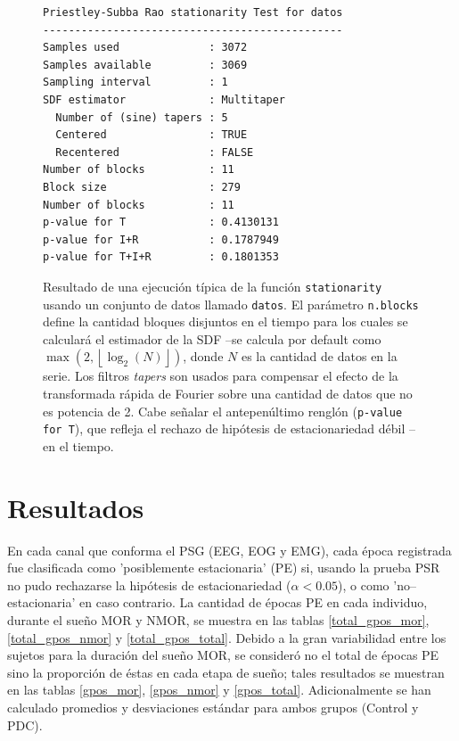 \documentclass[12pt,a4paper]{mitthesis}
\begin{document}
\begin{figure}
\centering
\begin{lstlisting}
Priestley-Subba Rao stationarity Test for datos
-----------------------------------------------
Samples used              : 3072 
Samples available         : 3069 
Sampling interval         : 1 
SDF estimator             : Multitaper 
  Number of (sine) tapers : 5 
  Centered                : TRUE 
  Recentered              : FALSE 
Number of blocks          : 11 
Block size                : 279 
Number of blocks          : 11 
p-value for T             : 0.4130131 
p-value for I+R           : 0.1787949 
p-value for T+I+R         : 0.1801353 
\end{lstlisting}
\caption{Resultado de una ejecuci\'on t\'ipica de la funci\'on \texttt{stationarity} usando un 
conjunto de datos llamado \texttt{datos}. 
El par\'ametro \texttt{n.blocks} define la cantidad bloques disjuntos en el tiempo para los cuales 
se calcular\'a el estimador de la SDF --se calcula por default como
$\max \left( 2 , \left\lfloor \log_2\left( N \right) \right\rfloor \right)$, donde $N$ es la 
cantidad de datos en la serie.
Los filtros \textit{tapers} son usados para compensar el efecto de la transformada r\'apida de
Fourier sobre una cantidad de datos que no es potencia de 2.
Cabe se\~nalar el antepen\'ultimo rengl\'on (\texttt{p-value for T}), que refleja el rechazo de 
hip\'otesis de estacionariedad d\'ebil --en el tiempo.}
\label{res_psr}
\end{figure}


\chapter{Resultados}

En cada canal que conforma el PSG (EEG, EOG y EMG), cada \'epoca registrada fue clasificada como 
'posiblemente estacionaria' (PE) si, usando la prueba PSR no pudo rechazarse la hip\'otesis de 
estacionariedad ($\alpha < 0.05$), o como 'no--estacionaria' en caso contrario.
La cantidad de \'epocas PE en cada individuo, durante el sue\~no MOR y NMOR, se muestra en las 
tablas \ref{total_gpos_mor}, \ref{total_gpos_nmor} y \ref{total_gpos_total}. Debido a la gran 
variabilidad entre los sujetos para la duraci\'on del sue\~no MOR, se consider\'o no el total de 
\'epocas PE sino la proporci\'on de \'estas en cada etapa de sue\~no; tales resultados se muestran 
en las tablas \ref{gpos_mor}, \ref{gpos_nmor} y \ref{gpos_total}. 
Adicionalmente se han calculado promedios y desviaciones est\'andar para ambos grupos (Control y 
PDC).
\end{document}
